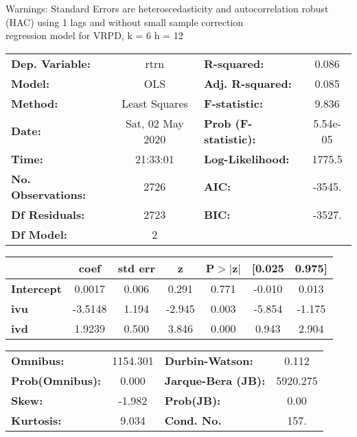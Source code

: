Warnings: \newline
 [1] Standard Errors are heteroscedasticity and autocorrelation robust (HAC) using 1 lags and without small sample correction\\ 

regression model for VRPD, k = 6 h = 12\begin{center}
\begin{tabular}{lclc}
\toprule
\textbf{Dep. Variable:}    &       rtrn       & \textbf{  R-squared:         } &     0.086   \\
\textbf{Model:}            &       OLS        & \textbf{  Adj. R-squared:    } &     0.085   \\
\textbf{Method:}           &  Least Squares   & \textbf{  F-statistic:       } &     9.836   \\
\textbf{Date:}             & Sat, 02 May 2020 & \textbf{  Prob (F-statistic):} &  5.54e-05   \\
\textbf{Time:}             &     21:33:01     & \textbf{  Log-Likelihood:    } &    1775.5   \\
\textbf{No. Observations:} &        2726      & \textbf{  AIC:               } &    -3545.   \\
\textbf{Df Residuals:}     &        2723      & \textbf{  BIC:               } &    -3527.   \\
\textbf{Df Model:}         &           2      & \textbf{                     } &             \\
\bottomrule
\end{tabular}
\begin{tabular}{lcccccc}
                   & \textbf{coef} & \textbf{std err} & \textbf{z} & \textbf{P$> |$z$|$} & \textbf{[0.025} & \textbf{0.975]}  \\
\midrule
\textbf{Intercept} &       0.0017  &        0.006     &     0.291  &         0.771        &       -0.010    &        0.013     \\
\textbf{ivu}       &      -3.5148  &        1.194     &    -2.945  &         0.003        &       -5.854    &       -1.175     \\
\textbf{ivd}       &       1.9239  &        0.500     &     3.846  &         0.000        &        0.943    &        2.904     \\
\bottomrule
\end{tabular}
\begin{tabular}{lclc}
\textbf{Omnibus:}       & 1154.301 & \textbf{  Durbin-Watson:     } &    0.112  \\
\textbf{Prob(Omnibus):} &   0.000  & \textbf{  Jarque-Bera (JB):  } & 5920.275  \\
\textbf{Skew:}          &  -1.982  & \textbf{  Prob(JB):          } &     0.00  \\
\textbf{Kurtosis:}      &   9.034  & \textbf{  Cond. No.          } &     157.  \\
\bottomrule
\end{tabular}
\end{center}

